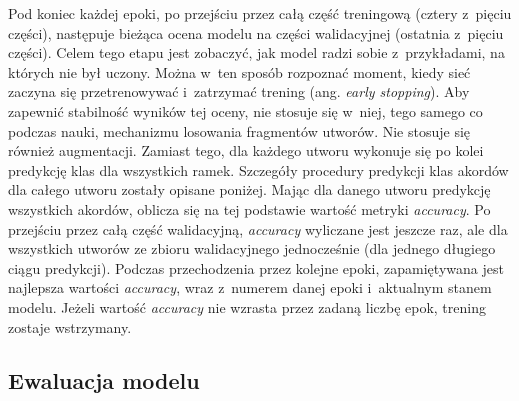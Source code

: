 Pod koniec każdej epoki, po przejściu przez całą część treningową (cztery z~pięciu części), następuje bieżąca ocena modelu na części walidacyjnej (ostatnia z~pięciu części). Celem tego etapu jest zobaczyć, jak model radzi sobie z~przykładami, na których nie był uczony. Można w~ten sposób rozpoznać moment, kiedy sieć zaczyna się przetrenowywać i~zatrzymać trening (ang. \emph{early stopping}). Aby zapewnić stabilność wyników tej oceny, nie stosuje się w~niej, tego samego co podczas nauki, mechanizmu losowania fragmentów utworów. Nie stosuje się również augmentacji. Zamiast tego, dla każdego utworu wykonuje się po kolei predykcję klas dla wszystkich ramek. Szczegóły procedury predykcji klas akordów dla całego utworu zostały opisane poniżej. Mając dla danego utworu predykcję wszystkich akordów, oblicza się na tej podstawie wartość metryki \emph{accuracy}. Po przejściu przez całą część walidacyjną, \emph{accuracy} wyliczane jest jeszcze raz, ale dla wszystkich utworów ze zbioru walidacyjnego jednocześnie (dla jednego długiego ciągu predykcji). Podczas przechodzenia przez kolejne epoki, zapamiętywana jest najlepsza wartości \emph{accuracy}, wraz z~numerem danej epoki i~aktualnym stanem modelu. Jeżeli wartość \emph{accuracy} nie wzrasta przez zadaną liczbę epok, trening zostaje wstrzymany.

\subsection{Ewaluacja modelu} \label{subsection:model_evaluation}

